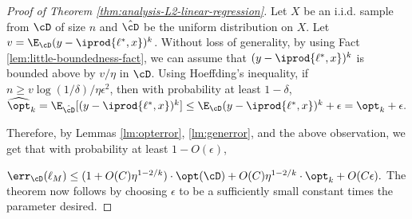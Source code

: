 \begin{proof}[Proof of Theorem \ref{thm:analysis-L2-linear-regression}] Let $X$ be an i.i.d. sample from $\cD$ of size $n$ and $\hat{\cD}$ be the uniform distribution on $X$.
Let $v = \E_{\cD} (y- \iprod{\ell^{*},x})^k$. Without loss of generality, by using Fact \ref{lem:little-boundedness-fact}, we can assume that $(y- \iprod{\ell^{*},x})^k$ is bounded above by $v/\eta$ in $\cD$. Using Hoeffding's inequality, if $n \geq v\log{(1/\delta)}/\eta \epsilon^2$, then with probability at least $1-\delta$, $\widehat{\opt}_k = \E_{\hat{\cD}} [(y - \iprod{\ell^{*},x})^k] \leq \E_{\cD} (y - \iprod{\ell^{*},x})^k + \epsilon = \opt_k + \epsilon.$

Therefore, by Lemmas \ref{lm:opterror}, \ref{lm:generror}, and the above observation, we get that with probability at least $1 - O(\epsilon)$, 

$\err_{\cD}(\ell_M) \leq (1 + O(C) \eta^{1-2/k}) \cdot \opt(\cD) + O(C) \eta^{1-2/k} \cdot \opt_k + O( C \epsilon).$
The theorem now follows by choosing $\epsilon$ to be a sufficiently small constant times the parameter desired. 
\end{proof}
